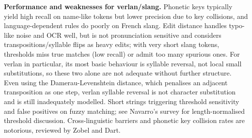 \documentclass[12pt]{article}
\begin{document}
\noindent\textbf{Performance and weaknesses for verlan/slang.} Phonetic keys typically yield high recall on name-like tokens but lower precision due to key collisions, and language-dependent rules do poorly on French slang. Edit distance handles typo-like noise and OCR well, but is not pronunciation sensitive and considers transpositions/syllable flips as heavy edits; with very short slang tokens, thresholds miss true matches (low recall) or admit too many spurious ones. For verlan in particular, its most basic behaviour is syllable reversal, not local small substitutions, so these two alone are not adequate without further structure. Even using the Damerau-Levenshtein distance, which penalises an adjacent transposition as one step, verlan syllable reversal is not character substitution and is still inadequately modelled. Short strings triggering threshold sensitivity and false positives on fuzzy matching; see Navarro's survey for length-normalised threshold discussion. Cross-linguistic barriers and phonetic key collision rates are notorious, reviewed by Zobel and Dart. \cite{damerau1964,navarro2001approximate,zobel1996phonetic}

\begin{table}[H]
\centering
{}
\caption{Classical fuzzy-match methods: strengths and limitations for slang/verlan.}
\label{tab:fuzzy_perf}
\end{table}
\end{document}
